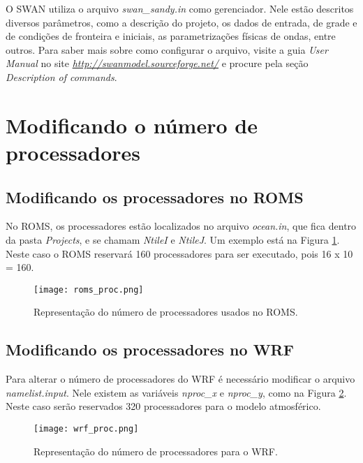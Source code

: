 \noindent O SWAN utiliza o arquivo \textit{swan\_sandy.in} como gerenciador. Nele estão descritos diversos parâmetros, como a descrição do projeto, os dados de entrada, de grade e de condições de fronteira e iniciais, as parametrizações físicas de ondas, entre outros. Para saber mais sobre como configurar o arquivo, visite a guia \textit{User Manual} no site \textcolor{bleu_cite}{\href{http://swanmodel.sourceforge.net/}{\textit{http://swanmodel.sourceforge.net/}}} e procure pela seção \textit{Description of commands}.
\bigskip

\section{Modificando o número de processadores}
\bigskip

\subsection{Modificando os processadores no ROMS}
\bigskip

\noindent No ROMS, os processadores estão localizados no arquivo \textit{ocean.in}, que fica dentro da pasta \textit{Projects}, e se chamam \textit{NtileI} e \textit{NtileJ}. Um exemplo está na Figura \textcolor{bleu_cite}{\ref{romsproc}}. Neste caso o ROMS reservará 160 processadores para ser executado, pois 16 x 10 = 160.
\bigskip

\begin{figure}[H]
    \centering
    \texttt{[image: roms\_proc.png]}
    \caption{Representação do número de processadores usados no ROMS.}
    \label{romsproc}
\end{figure}
\bigskip

\subsection{Modificando os processadores no WRF}
\bigskip

\noindent Para alterar o número de processadores do WRF é necessário modificar o arquivo \textit{namelist.input}. Nele existem as variáveis \textit{nproc\_x} e \textit{nproc\_y}, como na Figura \textcolor{bleu_cite}{\ref{procswrf}}. Neste caso serão reservados 320 processadores para o modelo atmosférico.
\bigskip

\begin{figure}[H]
    \centering
    \texttt{[image: wrf\_proc.png]}
    \caption{Representação do número de processadores para o WRF.}
    \label{procswrf}
\end{figure}
\bigskip

